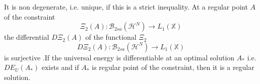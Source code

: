 \documentclass[aps,preprint]{revtex4}%
\begin{document}
It is non degenerate, i.e. unique, if this is a strict inequality. At a
regular point $A$ of the constraint
\begin{equation}
\Xi_{2}\left(  A\right)  :\mathcal{B}_{2sa}\left(  \mathcal{H}^{N}\right)
\rightarrow L_{1}\left(  \mathbb{X}\right)
\end{equation}
the differential $D\Xi_{2}\left(  A\right)  $ of the functional $\Xi_{2}$
\begin{equation}
D\Xi_{2}\left(  A\right)  :\mathcal{B}_{2sa}\left(  \mathcal{H}^{N}\right)
\rightarrow L_{1}\left(  \mathbb{X}\right)
\end{equation}
is surjective \cite{weiner2006}.If the universal energy is differentiable at
an optimal solution $A_{\ast}$ i.e. $DE_{U}\left(  A_{\ast}\right)  $ exists
and if $A_{\ast}$ is regular point of the constraint, then it is a regular solution.
\end{document}

